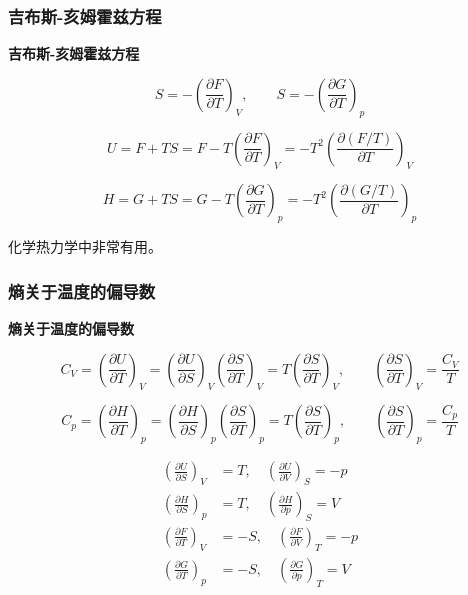 \documentclass[UTF8]{ctexart}
\theoremstyle{definition}
\begin{document}
\subsubsection*{吉布斯-亥姆霍兹方程}

\textbf{吉布斯-亥姆霍兹方程}

\begin{equation}
S = -\left(\frac{\partial F}{\partial T}\right)_V,\qquad S = -\left(\frac{\partial G}{\partial T}\right)_p
\end{equation}

\begin{equation}
U = F + TS = F - T\left(\frac{\partial F}{\partial T}\right)_V = -T^2\left(\frac{\partial(F/T)}{\partial T}\right)_V
\end{equation}

\begin{equation}
H = G + TS = G - T\left(\frac{\partial G}{\partial T}\right)_p = -T^2\left(\frac{\partial(G/T)}{\partial T}\right)_p
\end{equation}

化学热力学中非常有用。

\subsubsection*{熵关于温度的偏导数}

\textbf{熵关于温度的偏导数}

\begin{equation}
C_V = \left(\frac{\partial U}{\partial T}\right)_V = \left(\frac{\partial U}{\partial S}\right)_V\left(\frac{\partial S}{\partial T}\right)_V = T\left(\frac{\partial S}{\partial T}\right)_V,\qquad \left(\frac{\partial S}{\partial T}\right)_V = \frac{C_V}{T}
\end{equation}

\begin{equation}
C_p = \left(\frac{\partial H}{\partial T}\right)_p = \left(\frac{\partial H}{\partial S}\right)_p\left(\frac{\partial S}{\partial T}\right)_p = T\left(\frac{\partial S}{\partial T}\right)_p,\qquad \left(\frac{\partial S}{\partial T}\right)_p = \frac{C_p}{T}
\end{equation}

\begin{equation}
\begin{aligned}
\left(\frac{\partial U}{\partial S}\right)_V &= T,\quad \left(\frac{\partial U}{\partial V}\right)_S = -p \\
\left(\frac{\partial H}{\partial S}\right)_p &= T,\quad \left(\frac{\partial H}{\partial p}\right)_S = V \\
\left(\frac{\partial F}{\partial T}\right)_V &= -S,\quad \left(\frac{\partial F}{\partial V}\right)_T = -p \\
\left(\frac{\partial G}{\partial T}\right)_p &= -S,\quad \left(\frac{\partial G}{\partial p}\right)_T = V
\end{aligned}
\end{equation}
\end{document}
